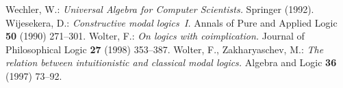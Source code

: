 \documentclass[draft]{article}
\begin{document}
\begin{thebibliography}{}
%
%
%
%
%
%
%
%
%
%
%
%
%
%
%
%
%
%
%
%
Wechler, W.:
{\it Universal Algebra for Computer Scientists.}
Springer (1992).
%
%
Wijesekera, D.:
{\it Constructive modal logics~I.}
Annals of Pure and Applied Logic {\bf 50} (1990) 271--301.
%
%
Wolter, F.:
{\it On logics with coimplication.}
Journal of Philosophical Logic {\bf 27} (1998) 353--387.
%
%
%
%
Wolter, F., Zakharyaschev, M.:
{\it The relation between intuitionistic and classical modal logics.}
Algebra and Logic {\bf 36} (1997) 73--92.
%
%
\end{thebibliography}
%
%
%
%
\end{document}
